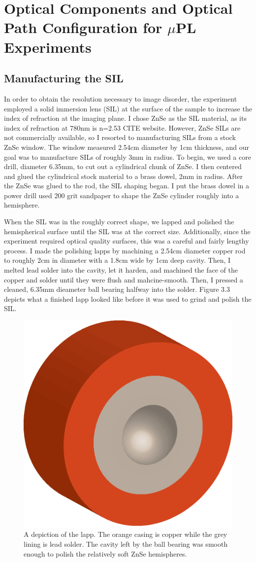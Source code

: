 \section{Optical Components and Optical Path Configuration for $\mu$PL Experiments}

\subsection{Manufacturing the SIL}

\indent In order to obtain the resolution necessary to image disorder, the experiment employed a solid immersion lens (SIL) at the surface of the sample to increase the index of refraction at the imaging plane. I chose ZnSe as the SIL material, as its index of refraction at 780nm is n=2.53 CITE website. However, ZnSe SILs are not commercially available, so I resorted to manufacturing SILs from a stock ZnSe window. The window measured 2.54cm diameter by 1cm thickness, and our goal was to manufacture SILs of roughly 3mm in radius. To begin, we used a core drill, diameter 6.35mm, to cut out a cylindrical chunk of ZnSe. I then centered and glued the cylindrical stock material to a brass dowel, 2mm in radius. After the ZnSe was glued to the rod, the SIL shaping began. I put the brass dowel in a power drill used 200 grit sandpaper to shape the ZnSe cylinder roughly into a hemisphere.

\indent  When the SIL was in the roughly correct shape, we lapped and polished the hemispherical surface until the SIL was at the correct size. Additionally, since the experiment required optical quality surfaces, this was a careful and fairly lengthy process. I made the polishing lapps by machining a 2.54cm diameter copper rod to roughly 2cm in diameter with a 1.8cm wide by 1cm deep cavity. Then, I melted lead solder into the cavity, let it harden, and machined the face of the copper and solder until they were flush and mahcine-smooth. Then, I pressed a cleaned, 6.35mm dieameter ball bearing halfway into the solder. Figure 3.3 depicts what a finished lapp looked like before it was used to grind and polish the SIL. 

\begin{figure}[h!]
\centering
\includegraphics[width = .3\textwidth]{lapp.eps}
\caption{ \doublespacing A depiction of the lapp. The orange casing is copper while the grey lining is lead solder. The cavity left by the ball bearing was smooth enough to polish the relatively soft ZnSe hemispheres.}
\label{lapp}
\end{figure}



